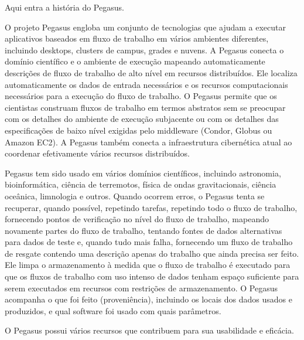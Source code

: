 \documentclass[tese,capa]{texufpel}
\begin{document}
Aqui entra a história do Pegasus.

O projeto Pegasus engloba um conjunto de tecnologias que ajudam a executar aplicativos baseados em fluxo de trabalho em vários ambientes diferentes, incluindo desktops, clusters de campus, grades e nuvens. A Pegasus conecta o domínio científico e o ambiente de execução mapeando automaticamente descrições de fluxo de trabalho de alto nível em recursos distribuídos. Ele localiza automaticamente os dados de entrada necessários e os recursos computacionais necessários para a execução do fluxo de trabalho. O Pegasus permite que os cientistas construam fluxos de trabalho em termos abstratos sem se preocupar com os detalhes do ambiente de execução subjacente ou com os detalhes das especificações de baixo nível exigidas pelo middleware (Condor, Globus ou Amazon EC2). A Pegasus também conecta a infraestrutura cibernética atual ao coordenar efetivamente vários recursos distribuídos.

Pegasus tem sido usado em vários domínios científicos, incluindo astronomia, bioinformática, ciência de terremotos, física de ondas gravitacionais, ciência oceânica, limnologia e outros. Quando ocorrem erros, o Pegasus tenta se recuperar, quando possível, repetindo tarefas, repetindo todo o fluxo de trabalho, fornecendo pontos de verificação no nível do fluxo de trabalho, mapeando novamente partes do fluxo de trabalho, tentando fontes de dados alternativas para dados de teste e, quando tudo mais falha, fornecendo um fluxo de trabalho de resgate contendo uma descrição apenas do trabalho que ainda precisa ser feito. Ele limpa o armazenamento à medida que o fluxo de trabalho é executado para que os fluxos de trabalho com uso intenso de dados tenham espaço suficiente para serem executados em recursos com restrições de armazenamento. O Pegasus acompanha o que foi feito (proveniência), incluindo os locais dos dados usados e produzidos, e qual software foi usado com quais parâmetros.

O Pegasus possui vários recursos que contribuem para sua usabilidade e eficácia.
\end{document}
